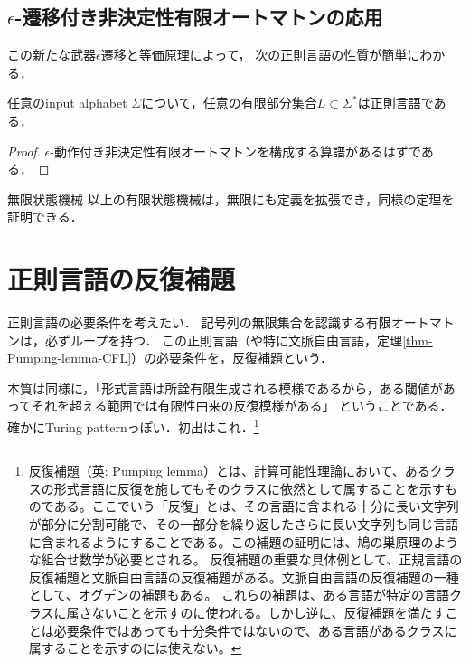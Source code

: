 \documentclass[uplatex, dvipdfmx]{jsreport}
\begin{document}
\subsection{$\epsilon$-遷移付き非決定性有限オートマトンの応用}

\begin{tcolorbox}[colframe=ForestGreen, colback=ForestGreen!10!white, breakable]
    この新たな武器$\epsilon$遷移と等価原理によって，
    次の正則言語の性質が簡単にわかる．
\end{tcolorbox}

\begin{proposition}[有限な言語は全て正則]
    任意のinput alphabet $\Sigma$について，任意の有限部分集合$L\subset\Sigma^*$は正則言語である．
\end{proposition}
\begin{proof}
    $\epsilon$-動作付き非決定性有限オートマトンを構成する算譜があるはずである．
\end{proof}

\begin{itembox}[l]{無限状態機械}
    以上の有限状態機械は，無限にも定義を拡張でき，同様の定理を証明できる．
\end{itembox}

\section{正則言語の反復補題}

\begin{tcolorbox}[colframe=ForestGreen, colback=ForestGreen!10!white, breakable]
    正則言語の必要条件を考えたい．
    記号列の無限集合を認識する有限オートマトンは，必ずループを持つ．
    この正則言語（や特に文脈自由言語，定理\ref{thm-Pumping-lemma-CFL}）の必要条件を，反復補題という．

    本質は同様に，「形式言語は所詮有限生成される模様であるから，ある閾値があってそれを超える範囲では有限性由来の反復模様がある」
    ということである．確かにTuring patternっぽい．初出はこれ\cite{pumping}．\footnote{反復補題（英: Pumping lemma）とは、計算可能性理論において、あるクラスの形式言語に反復を施してもそのクラスに依然として属することを示すものである。ここでいう「反復」とは、その言語に含まれる十分に長い文字列が部分に分割可能で、その一部分を繰り返したさらに長い文字列も同じ言語に含まれるようにすることである。この補題の証明には、鳩の巣原理のような組合せ数学が必要とされる。
    反復補題の重要な具体例として、正規言語の反復補題と文脈自由言語の反復補題がある。文脈自由言語の反復補題の一種として、オグデンの補題もある。
    これらの補題は、ある言語が特定の言語クラスに属さないことを示すのに使われる。しかし逆に、反復補題を満たすことは必要条件ではあっても十分条件ではないので、ある言語があるクラスに属することを示すのには使えない。}
\end{tcolorbox}
\end{document}
